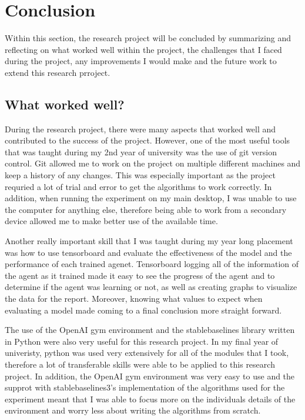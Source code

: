 \section{Conclusion}

Within this section, the research project will be concluded by summarizing and reflecting on what worked well within the project, the challenges that I faced during the project, any improvements I would make and the future work to extend this research prroject.

\subsection{What worked well?}

During the research project, there were many aspects that worked well and contributed to the success of the project. However, one of the most useful tools that was taught during my 2nd year of university was the use of git version control. Git allowed me to work on the project on multiple different machines and keep a history of any changes. This was especially important as the project requried a lot of trial and error to get the algorithms to work correctly. In addition, when running the experiment on my main desktop, I was unable to use the computer for anything else, therefore being able to work from a secondary device allowed me to make better use of the available time.  

Another really important skill that I was taught during my year long placement was how to use tensorboard and evaluate the effectiveness of the model and the performance of each trained agenet. Tensorboard logging all of the information of the agent as it trained made it easy to see the progress of the agent and to determine if the agent was learning or not, as well as creating graphs to visualize the data for the report. Moreover, knowing what values to expect when evaluating a model made coming to a final conclusion more straight forward.  

The use of the OpenAI gym environment and the stablebaselines library written in Python were also very useful for this research project. In my final year of univeristy, python was used very extensively for all of the modules that I took, therefore a lot of transferable skills were able to be applied to this research project. In addition, the OpenAI gym environment was very easy to use and the supprot with stablebaselines3's implementation of the algorithms used for the experiment meant that I was able to focus more on the individuals details of the environment and worry less about writing the algorithms from scratch. 

